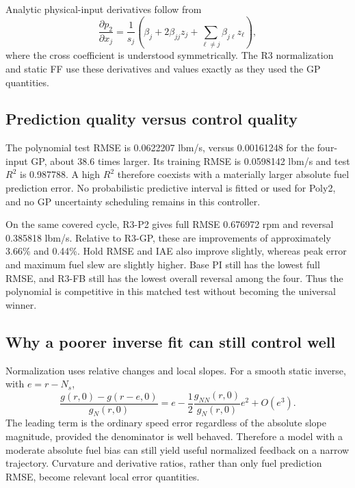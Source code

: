 Analytic physical-input derivatives follow from
\begin{equation}
\frac{\partial p_2}{\partial x_j}=\frac1{s_j}
\left(\beta_j+2\beta_{jj}z_j+\sum_{\ell\ne j}\beta_{j\ell}z_\ell\right),
\end{equation}
where the cross coefficient is understood symmetrically. The R3 normalization and static FF use these derivatives and values exactly as they used the GP quantities.

\subsection{Prediction quality versus control quality}
The polynomial test RMSE is 0.0622207 lbm/s, versus 0.00161248 for the four-input GP, about 38.6 times larger. Its training RMSE is 0.0598142 lbm/s and test $R^2$ is 0.987788. A high $R^2$ therefore coexists with a materially larger absolute fuel prediction error. No probabilistic predictive interval is fitted or used for Poly2, and no GP uncertainty scheduling remains in this controller.


On the same covered cycle, R3-P2 gives full RMSE 0.676972 rpm and reversal 0.385818 lbm/s. Relative to R3-GP, these are improvements of approximately 3.66\% and 0.44\%. Hold RMSE and IAE also improve slightly, whereas peak error and maximum fuel slew are slightly higher. Base PI still has the lowest full RMSE, and R3-FB still has the lowest overall reversal among the four. Thus the polynomial is competitive in this matched test without becoming the universal winner.


\subsection{Why a poorer inverse fit can still control well}
Normalization uses relative changes and local slopes. For a smooth static inverse, with $e=r-N_s$,
\begin{equation}
\frac{g(r,0)-g(r-e,0)}{g_N(r,0)}
=e-\frac12\frac{g_{NN}(r,0)}{g_N(r,0)}e^2+O(e^3).
\end{equation}
The leading term is the ordinary speed error regardless of the absolute slope magnitude, provided the denominator is well behaved. Therefore a model with a moderate absolute fuel bias can still yield useful normalized feedback on a narrow trajectory. Curvature and derivative ratios, rather than only fuel prediction RMSE, become relevant local error quantities.

